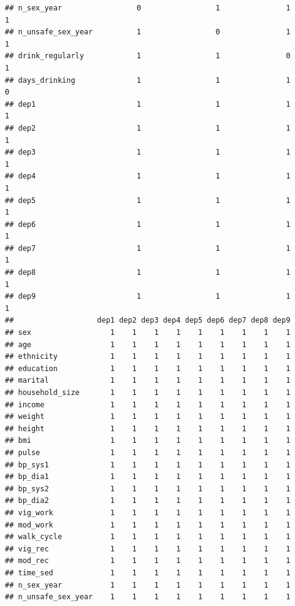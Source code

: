 \documentclass[
]{article}
\begin{document}
\begin{verbatim}
## n_sex_year                 0                 1               1             1
## n_unsafe_sex_year          1                 0               1             1
## drink_regularly            1                 1               0             1
## days_drinking              1                 1               1             0
## dep1                       1                 1               1             1
## dep2                       1                 1               1             1
## dep3                       1                 1               1             1
## dep4                       1                 1               1             1
## dep5                       1                 1               1             1
## dep6                       1                 1               1             1
## dep7                       1                 1               1             1
## dep8                       1                 1               1             1
## dep9                       1                 1               1             1
##                   dep1 dep2 dep3 dep4 dep5 dep6 dep7 dep8 dep9
## sex                  1    1    1    1    1    1    1    1    1
## age                  1    1    1    1    1    1    1    1    1
## ethnicity            1    1    1    1    1    1    1    1    1
## education            1    1    1    1    1    1    1    1    1
## marital              1    1    1    1    1    1    1    1    1
## household_size       1    1    1    1    1    1    1    1    1
## income               1    1    1    1    1    1    1    1    1
## weight               1    1    1    1    1    1    1    1    1
## height               1    1    1    1    1    1    1    1    1
## bmi                  1    1    1    1    1    1    1    1    1
## pulse                1    1    1    1    1    1    1    1    1
## bp_sys1              1    1    1    1    1    1    1    1    1
## bp_dia1              1    1    1    1    1    1    1    1    1
## bp_sys2              1    1    1    1    1    1    1    1    1
## bp_dia2              1    1    1    1    1    1    1    1    1
## vig_work             1    1    1    1    1    1    1    1    1
## mod_work             1    1    1    1    1    1    1    1    1
## walk_cycle           1    1    1    1    1    1    1    1    1
## vig_rec              1    1    1    1    1    1    1    1    1
## mod_rec              1    1    1    1    1    1    1    1    1
## time_sed             1    1    1    1    1    1    1    1    1
## n_sex_year           1    1    1    1    1    1    1    1    1
## n_unsafe_sex_year    1    1    1    1    1    1    1    1    1

\end{verbatim}
\end{document}

